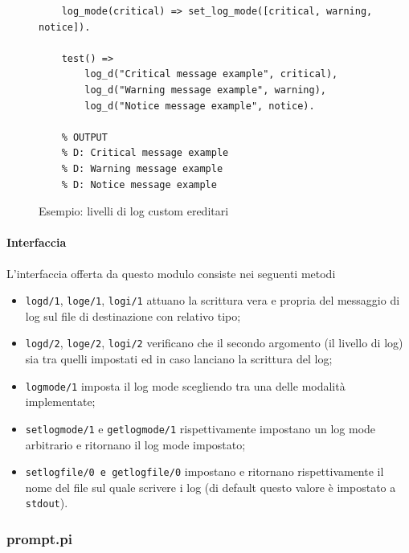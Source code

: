 \documentclass[12pt,a4paper,openright]{book} %
\begin{document}
\begin{figure}
	\begin{verbatim}	
	log_mode(critical) => set_log_mode([critical, warning, notice]).
	
	test() =>
		log_d("Critical message example", critical),
		log_d("Warning message example", warning),
		log_d("Notice message example", notice).
	
	% OUTPUT
	% D: Critical message example
	% D: Warning message example
	% D: Notice message example
	\end{verbatim}
	\caption{Esempio: livelli di log custom ereditari}
	\label{fig:example_loglevel_inheritance}
\end{figure}

\paragraph{Interfaccia}

L'interfaccia offerta da questo modulo consiste nei seguenti metodi
\begin{itemize}
	\item \texttt{log\textunderscore d/1}, \texttt{log\textunderscore e/1}, \texttt{log\textunderscore i/1} attuano la scrittura vera e propria del messaggio di log sul file di destinazione con relativo tipo;
	\item \texttt{log\textunderscore d/2}, \texttt{log\textunderscore e/2}, \texttt{log\textunderscore i/2} verificano che il secondo argomento (il livello di log) sia tra quelli impostati ed in caso lanciano la scrittura del log;
	\item \texttt{log\textunderscore mode/1} imposta il log mode scegliendo tra una delle modalità implementate;
	\item \texttt{set\textunderscore log\textunderscore mode/1} e \texttt{get\textunderscore log\textunderscore mode/1} rispettivamente  impostano un log mode arbitrario e ritornano il log mode impostato;
	\item \texttt{set\textunderscore log\textunderscore file/0 e get\textunderscore log\textunderscore file/0} impostano e ritornano rispettivamente il nome del file sul quale scrivere i log (di default questo valore è impostato a \texttt{stdout}).
\end{itemize}

\subsubsection{prompt.pi}
\end{document}
